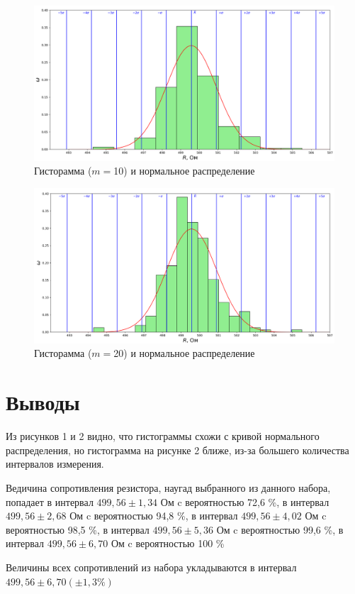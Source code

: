 \documentclass[a4paper, 12pt]{article}
\begin{document}
\begin{figure}[h!]
\centering
\label{hist1}
\caption{Гисторамма ($m=$10) и нормальное распределение}
\includegraphics[scale=0.5]{hist1.png}
\end{figure}

\begin{figure}[h!]
\centering
\label{hist2}
\caption{Гисторамма ($m=$20) и нормальное распределение}
\includegraphics[scale=0.5]{hist2.png}
\end{figure}

\pagebreak
\section{Выводы}
Из рисунков 1 и 2 видно, что гистограммы схожи с кривой нормального распределения, но гистограмма на рисунке 2 ближе, из-за большего количества интервалов измерения.

Ведичина сопротивления резистора, наугад выбранного из данного набора, попадает в интервал $499,56 \pm 1,34$ Ом c вероятностью 72,6 \%, в интервал $499,56 \pm 2,68$ Ом c вероятностью 94,8 \%, в интервал $499,56 \pm 4,02$ Ом c вероятностью 98,5 \%, в интервал $499,56 \pm 5,36$ Ом c вероятностью 99,6 \%, в интервал $499,56 \pm 6,70$ Ом c вероятностью 100 \%

Величины всех сопротивлений из набора укладываются в интервал $499,56 \pm 6,70 (\pm 1,3 \%)$
\end{document}
